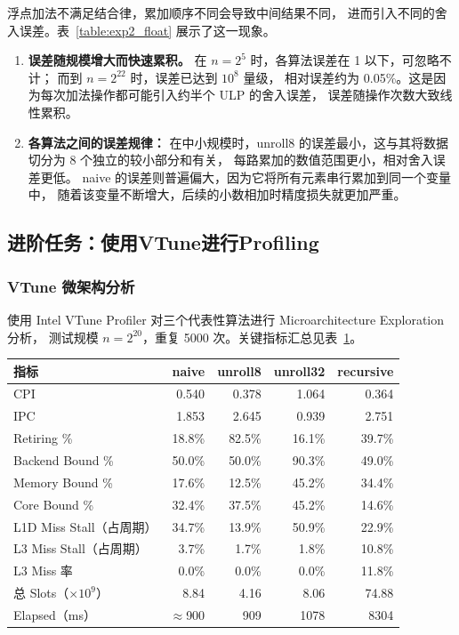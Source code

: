 \documentclass[a4paper]{article}
\begin{document}
浮点加法不满足结合律，累加顺序不同会导致中间结果不同，
进而引入不同的舍入误差。表~\ref{table:exp2_float} 展示了这一现象。
\begin{enumerate}
    \item \textbf{误差随规模增大而快速累积。}
在 $n=2^5$ 时，各算法误差在 1 以下，可忽略不计；
而到 $n=2^{22}$ 时，误差已达到 $10^8$ 量级，
相对误差约为 0.05\%。这是因为每次加法操作都可能引入约半个 ULP 的舍入误差，
误差随操作次数大致线性累积。
    \item  \textbf{各算法之间的误差规律：}
在中小规模时，unroll8 的误差最小，这与其将数据切分为 8 个独立的较小部分和有关，
每路累加的数值范围更小，相对舍入误差更低。
naive 的误差则普遍偏大，因为它将所有元素串行累加到同一个变量中，
随着该变量不断增大，后续的小数相加时精度损失就更加严重。
\end{enumerate}





\subsection{进阶任务：使用VTune进行Profiling}
\subsubsection{VTune 微架构分析}

使用 Intel VTune Profiler 对三个代表性算法进行 Microarchitecture Exploration 分析，
测试规模 $n=2^{20}$，重复 5000 次。关键指标汇总见表~\ref{table:vtune}。

\begin{table}[H]
\centering
\label{table:vtune}
\begin{tabular}{@{}lrrrr@{}}
\toprule
指标 & naive & unroll8 & unroll32 & recursive \\
\midrule
CPI                   & 0.540  & 0.378  & 1.064  & 0.364  \\
IPC                   & 1.853  & 2.645  & 0.939  & 2.751  \\
Retiring \%           & 18.8\% & 82.5\% & 16.1\% & 39.7\% \\
Backend Bound \%      & 50.0\% & 50.0\% & 90.3\% & 49.0\% \\
\quad Memory Bound \% & 17.6\% & 12.5\% & 45.2\% & 34.4\% \\
\quad Core Bound \%   & 32.4\% & 37.5\% & 45.2\% & 14.6\% \\
L1D Miss Stall（占周期）& 34.7\% & 13.9\% & 50.9\% & 22.9\% \\
L3 Miss Stall（占周期）&  3.7\% &  1.7\% &  1.8\% & 10.8\% \\
L3 Miss 率            &  0.0\% &  0.0\% &  0.0\% & 11.8\% \\
总 Slots（$\times 10^9$）& 8.84 & 4.16 & 8.06 & 74.88 \\
Elapsed（ms）         & $\approx$900 & 909 & 1078 & 8304  \\
\bottomrule
\end{tabular}
\end{table}
\end{document}
